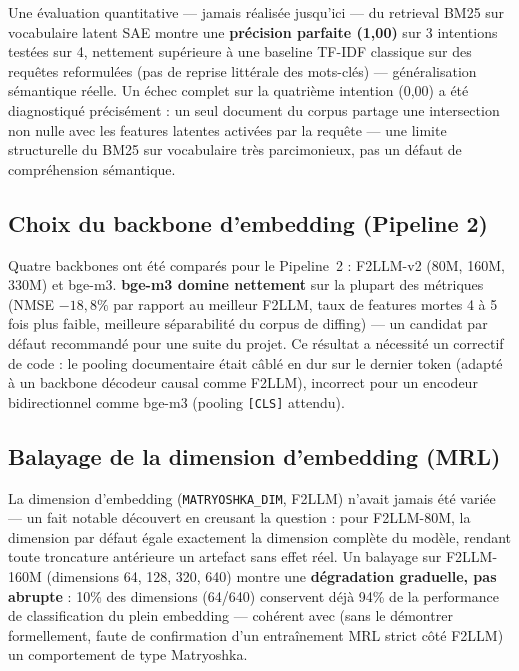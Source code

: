 \documentclass[11pt]{article}
\begin{document}
Une évaluation quantitative --- jamais réalisée jusqu'ici --- du retrieval
BM25 sur vocabulaire latent SAE \cite{clavie2026latentterms} montre une
\textbf{précision parfaite (1,00)} sur 3 intentions testées sur 4, nettement
supérieure à une baseline TF-IDF classique sur des requêtes reformulées (pas
de reprise littérale des mots-clés) --- généralisation sémantique réelle. Un
échec complet sur la quatrième intention (0,00) a été diagnostiqué
précisément : un seul document du corpus partage une intersection non nulle
avec les features latentes activées par la requête --- une limite
structurelle du BM25 sur vocabulaire très parcimonieux, pas un défaut de
compréhension sémantique.

\subsection{Choix du backbone d'embedding (Pipeline 2)}

Quatre backbones ont été comparés pour le Pipeline~2 : F2LLM-v2 (80M, 160M,
330M) et bge-m3. \textbf{bge-m3 domine nettement} sur la plupart des
métriques (NMSE $-18,8\%$ par rapport au meilleur F2LLM, taux de features
mortes 4 à 5 fois plus faible, meilleure séparabilité du corpus de diffing)
--- un candidat par défaut recommandé pour une suite du projet. Ce résultat a
nécessité un correctif de code : le pooling documentaire était câblé en dur
sur le dernier token (adapté à un backbone décodeur causal comme F2LLM),
incorrect pour un encodeur bidirectionnel comme bge-m3 (pooling \texttt{[CLS]}
attendu).

\subsection{Balayage de la dimension d'embedding (MRL)}

La dimension d'embedding (\texttt{MATRYOSHKA\_DIM}, F2LLM) n'avait jamais été
variée --- un fait notable découvert en creusant la question : pour
F2LLM-80M, la dimension par défaut égale exactement la dimension complète du
modèle, rendant toute \og{}troncature\fg{} antérieure un artefact sans effet
réel. Un balayage sur F2LLM-160M (dimensions 64, 128, 320, 640) montre une
\textbf{dégradation graduelle, pas abrupte} : 10\% des dimensions (64/640)
conservent déjà 94\% de la performance de classification du plein embedding
--- cohérent avec (sans le démontrer formellement, faute de confirmation d'un
entraînement MRL strict côté F2LLM) un comportement de type Matryoshka.
\end{document}

